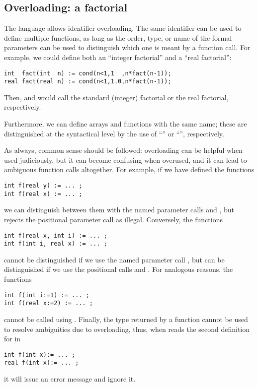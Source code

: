 \subsection{Overloading: a  factorial} \label{SEC:realFactorial}

The {\smart} language allows identifier overloading.
The same identifier can be used to define multiple functions, as long as
the order, type, or name of the formal parameters can be used to
distinguish which one is meant by a function call.  For example, we
could define both an ``integer factorial'' and a ``real factorial'':
\begin{lstlisting}
int  fact(int  n) := cond(n<1,1  ,n*fact(n-1));
real fact(real n) := cond(n<1,1.0,n*fact(n-1));
\end{lstlisting}
Then,  and  would call the standard
(integer) factorial or the real factorial, respectively.

\begin{comment}
Overloading also applies to arrays.  If we defined
\begin{lstlisting}
for (int i in {0..9}) {
  real f[i] := i * 1.0;
}
for (real i in {1.0..9.0..1.0}) {
  real f[i] := i * 10.0;
}
\end{lstlisting}
the expressions \Code{f[2]} and \Code{f[2.0]} would refer to the first and
second array, respectively.
\end{comment}
Furthermore, we can define arrays and functions with the same name;
these are distinguished at the syntactical level by the use of
``\Code{[]}'' or ``\Code{()}'', respectively.

As always, common sense should be followed:
overloading can be helpful when used judiciously, but it can become confusing
when overused, and it can lead to ambiguous function calls altogether.
For example, if we have defined the functions
\begin{lstlisting}
int f(real y) := ... ;
int f(real x) := ... ;
\end{lstlisting}
we can distinguish between them with the named parameter calls
 and , but {\smart} rejects the positional
parameter call  as illegal.
Conversely, the functions
\begin{lstlisting}
int f(real x, int i) := ... ;
int f(int i, real x) := ... ;
\end{lstlisting}
cannot be distinguished if we use the named parameter call
, but can be
distinguished if we use the positional calls 
and .
For analogous reasons, the functions
\begin{lstlisting}
int f(int i:=1) := ... ;
int f(real x:=2) := ... ;
\end{lstlisting}
cannot be called using .
Finally, the type returned by a function cannot be used to resolve ambiguities
due to overloading, thus, when {\smart} reads the second definition for 
in
\begin{lstlisting}
int f(int x):= ... ;
real f(int x):= ... ;
\end{lstlisting}
it will issue an error message and ignore it.




